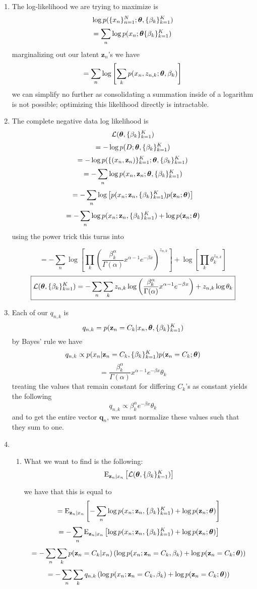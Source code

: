\documentclass[submit]{harvardml}
\begin{document}
\begin{enumerate}
  \item
  The log-likelihood we are trying to maximize is
  $$\log p(\{x_n\}^N_{n=1}; \boldsymbol{\theta}, \{\beta_k\}^K_{k = 1})$$
  $$=\sum_n\log p(x_n;\boldsymbol{\theta} \{\beta_k\}^K_{k = 1})$$
  marginalizing out our latent $\mathbf{z}_n$'s we have
  $$=\sum_n\log \left[ \sum_k p(x_n,z_{n,k};\boldsymbol{\theta},\beta_k) \right]$$
 we can simplify no further as consolidating a summation inside of a logarithm is not possible; optimizing this likelihood directly is intractable.
  
  \item 
  The complete negative data log likelihood is 
  $$\mathcal{L}(\boldsymbol{\theta},\{\beta_k\}^K_{k=1})$$
  $$=-\log p(D; \boldsymbol{\theta},\{\beta_k\}^K_{k=1})$$
  $$=-\log p(\{(x_n, \mathbf{z}_n)\}^K_{k=1};\boldsymbol{\theta},\{\beta_k\}^K_{k=1})$$
  $$=-\sum_n \log p(x_n, \mathbf{z}_n; \boldsymbol{\theta}, \{\beta_k\}^K_{k=1})$$
  $$=-\sum_n \log\left[p(x_n;\mathbf{z}_n, \{\beta_k\}^K_{k=1})p(\mathbf{z}_n;\boldsymbol{\theta})\right]$$
  $$=-\sum_n \log p(x_n;\mathbf{z}_n, \{\beta_k\}^K_{k=1}) +\log p(\mathbf{z}_n;\boldsymbol{\theta})$$
  using the power trick this turns into
  
  $$=-\sum_n \log\left[\prod_k\left(\frac{\beta_k^\alpha}{\Gamma(\alpha)}x^{\alpha-1}e^{-\beta x}\right)^{z_{n,k}}\right]+\log\left[\prod_k \theta_k^{z_{n,k}}\right]$$
  $$\boxed{\mathcal{L}(\boldsymbol{\theta},\{\beta_k\}^K_{k=1})=-\sum_n \sum_k z_{n,k}\log\left(\frac{\beta_k^\alpha}{\Gamma(\alpha)}x^{\alpha-1}e^{-\beta x}\right)+z_{n,k}\log\theta_k}$$


  \item 
  Each of our $q_{n,k}$ is
  $$q_{n,k}=p(\mathbf{z}_n=C_k|x_n,\boldsymbol{\theta},\{\beta_k\}^K_{k=1})$$
  by Bayes' rule we have
  $$q_{n,k}\propto p(x_n|\mathbf{z}_n=C_k,\{\beta_k\}^K_{k=1})p(\mathbf{z}_n=C_k;\boldsymbol{\theta})$$
  $$= \frac{\beta_k^\alpha}{\Gamma(\alpha)}x^{\alpha-1}e^{-\beta x}\theta_k$$
  treating the values that remain constant for differing $C_k$'s as constant yields the following
  $$\boxed{q_{n,k}\propto\beta_k^\alpha e^{-\beta x}\theta_k}$$
  and to get the entire vector $\mathbf{q}_n$, we must normalize these values such that they sum to one.
  
  \item 
    \begin{enumerate}
      \item 
      What we want to find is the following:
      $$\mathrm{E}_{\mathbf{z}_n|x_n}\left[\mathcal{L}(\boldsymbol{\theta},\{\beta_k\}^K_{k=1})\right]$$
      
      we have that this is equal to
      $$=\mathrm{E}_{\mathbf{z}_n|x_n}\left[-\sum_n\log p(x_n;\mathbf{z}_n,\{\beta_k\}^K_{k=1})+\log p(\mathbf{z}_n;\boldsymbol{\theta})\right]$$
      $$=-\sum_n\mathrm{E}_{\mathbf{z}_n|x_n}\left[\log p(x_n;\mathbf{z}_n,\{\beta_k\}^K_{k=1})+\log p(\mathbf{z}_n;\boldsymbol{\theta})\right]$$
      $$=-\sum_n\sum_k p(\mathbf{z}_n=C_k|x_n)\left(\log p(x_n;\mathbf{z}_n=C_k,\beta_k)+\log p(\mathbf{z}_n=C_k;\boldsymbol{\theta})\right)$$
      $$=-\sum_n\sum_k q_{n,k}\left(\log p(x_n;\mathbf{z}_n=C_k,\beta_k)+\log p(\mathbf{z}_n=C_k;\boldsymbol{\theta})\right)$$
      

\end{enumerate}
\end{enumerate}
\end{document}
